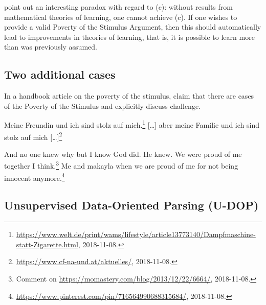 \citet[]{PS2002a} point out an interesting paradox with regard to (c):
without results from mathematical theories of learning, one cannot achieve (c). If one wishes to provide a valid
Poverty of the Stimulus Argument, then this should automatically lead to improvements in theories of learning, that is, it is possible
to learn more than was previously assumed.

\subsection{Two additional cases}

In a handbook article on the poverty of the stimulus, \citet{LL2016a} claim that there are cases of
the Poverty of the Stimulus and explicitly discuss  challenge.

\eal
\ex Meine Freundin und ich sind stolz auf mich.\footnote{%
\url{https://www.welt.de/print/wams/lifestyle/article13773140/Dampfmaschine-statt-Zigarette.html}, 2018-11-08.}
\ex {}[\ldots] aber meine Familie und ich sind stolz auf mich [\ldots]\footnote{%
  \url{https://www.cf-na-und.at/aktuelles/}, 2018-11-08.}
\zl

\eal
\ex And no one knew why but I know God did. He knew. We were proud of me together I think.\footnote{%
Comment on \url{https://momastery.com/blog/2013/12/22/6664/}, 2018-11-08.}
\ex Me and makayla when we are proud of me for not being innocent anymore.\footnote{%
\url{https://www.pinterest.com/pin/716564990688315684/}, 2018-11-08.}
\zl
\fi

\subsection{Unsupervised Data-Oriented Parsing (U-DOP)}
\label{Abschnitt-UDOP}

